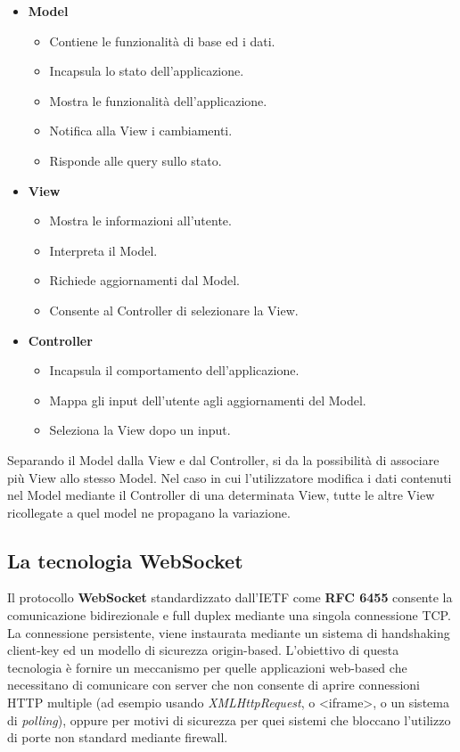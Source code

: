 \documentclass[12pt]{article}
\begin{document}
\begin{itemize}
\item \textbf{Model}
\begin{itemize}
	\item Contiene le funzionalità di base ed i dati.
	\item Incapsula lo stato dell'applicazione.
	\item Mostra le funzionalità dell'applicazione.
	\item Notifica alla View i cambiamenti.
	\item Risponde alle query sullo stato. 
\end{itemize}
\item \textbf{View}
\begin{itemize}
	\item Mostra le informazioni all'utente.
	\item Interpreta il Model.
	\item Richiede aggiornamenti dal Model.
	\item Consente al Controller di selezionare la View.
\end{itemize}
\item \textbf{Controller}
\begin{itemize}
	\item Incapsula il comportamento dell'applicazione.
	\item Mappa gli input dell'utente agli aggiornamenti del Model.
	\item Seleziona la View dopo un input.
\end{itemize}
\end{itemize}
Separando il Model dalla View e dal Controller, si da la possibilità di associare più View allo stesso Model. Nel caso in cui l'utilizzatore modifica i dati contenuti nel Model mediante il Controller di una determinata
View, tutte le altre View ricollegate a quel model ne propagano la variazione.

\subsection{La tecnologia WebSocket}
Il protocollo \textbf{WebSocket} standardizzato dall'IETF come \textbf{RFC 6455} consente la comunicazione bidirezionale e full duplex mediante una singola connessione TCP. La connessione persistente, viene instaurata mediante un sistema di handshaking client-key ed un modello di sicurezza origin-based. L'obiettivo di questa tecnologia è fornire un meccanismo per quelle applicazioni web-based che necessitano di comunicare con server che non consente di aprire connessioni HTTP multiple (ad esempio usando \textit{XMLHttpRequest}, o <iframe>, o un sistema di \textit{polling}), oppure per motivi di sicurezza per quei sistemi che bloccano l'utilizzo di porte non standard mediante firewall.
\end{document}
